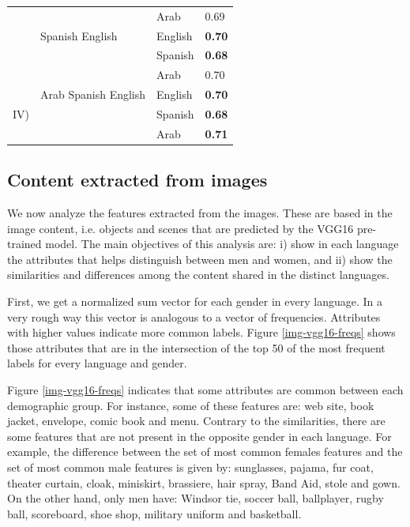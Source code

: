 \documentclass[runningheads]{llncs}
\begin{document}
\begin{table}[ht]
\begin{tabular}{@{}llll@{}}
                                 &                           & Arab                    & 0.69                         \\
                                 & Spanish English           & English                 & \textbf{0.70}                \\
                                 &                           & Spanish                 & \textbf{0.68}                \\
                                 &                           & Arab                    & 0.70                         \\ \midrule
\multirow{3}{*}{$\mathrm{IV}$)} & Arab Spanish English      & English                 & \textbf{0.70}                \\
                                 &                           & Spanish                 & \textbf{0.68}                \\
                                 &                           & Arab                    & \textbf{0.71}                \\ \bottomrule
\end{tabular}
\end{table}
\subsection{Content extracted from images}
We now analyze the features extracted from the images. These
are based in the image content, i.e. objects and scenes that
are predicted by the VGG16 pre-trained model.
The main objectives of this analysis are: i) show in each language the attributes that helps distinguish between men and women, and ii) show the similarities
and differences among the content shared in the distinct languages.

First, we get a normalized sum vector for each gender in every language.
In a very rough way
this vector is  analogous to a vector of frequencies.
Attributes with higher values indicate more common labels.
Figure \ref{img-vgg16-freqs} shows those attributes that are
in the intersection of the top 50 of the most frequent labels for every
language and gender.


Figure \ref{img-vgg16-freqs} indicates that some attributes
are common between each demographic group. For instance,
some of these features are: web site, book jacket, envelope, comic book and menu. Contrary to the similarities, there are 
some features that are not present in the opposite 
gender in each language.
For example, the difference between the set of most common females features and the set of most common male features is given by:
sunglasses,
pajama, fur coat, theater curtain, cloak, miniskirt, brassiere, hair spray, Band Aid, stole and gown. On the other hand, only men have: 
Windsor tie,
soccer ball, ballplayer, rugby ball, scoreboard, shoe shop, military uniform and basketball.
\end{document}

